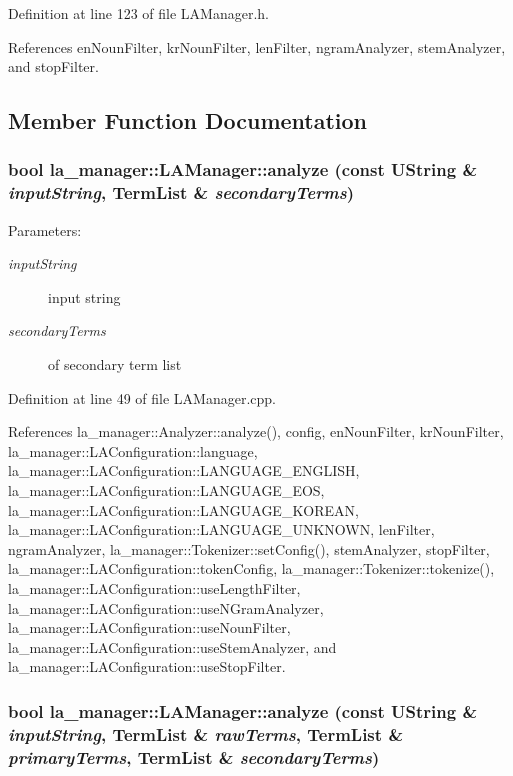Definition at line 123 of file LAManager.h.

References enNounFilter, krNounFilter, lenFilter, ngramAnalyzer, stemAnalyzer, and stopFilter.

\subsection{Member Function Documentation}
\hypertarget{classla__manager_1_1LAManager_1293ab3f57e2b05e1d062031c76444ad}{
\subsubsection[{analyze}]{\setlength{\rightskip}{0pt plus 5cm}bool la\_\-manager::LAManager::analyze (const UString \& {\em inputString}, \/  {\bf TermList} \& {\em secondaryTerms})}}
\label{classla__manager_1_1LAManager_1293ab3f57e2b05e1d062031c76444ad}


\begin{Desc}
\item[Parameters:]
\begin{description}
\item[{\em inputString}]input string \item[{\em secondaryTerms}]of secondary term list \end{description}
\end{Desc}


Definition at line 49 of file LAManager.cpp.

References la\_\-manager::Analyzer::analyze(), config, enNounFilter, krNounFilter, la\_\-manager::LAConfiguration::language, la\_\-manager::LAConfiguration::LANGUAGE\_\-ENGLISH, la\_\-manager::LAConfiguration::LANGUAGE\_\-EOS, la\_\-manager::LAConfiguration::LANGUAGE\_\-KOREAN, la\_\-manager::LAConfiguration::LANGUAGE\_\-UNKNOWN, lenFilter, ngramAnalyzer, la\_\-manager::Tokenizer::setConfig(), stemAnalyzer, stopFilter, la\_\-manager::LAConfiguration::tokenConfig, la\_\-manager::Tokenizer::tokenize(), la\_\-manager::LAConfiguration::useLengthFilter, la\_\-manager::LAConfiguration::useNGramAnalyzer, la\_\-manager::LAConfiguration::useNounFilter, la\_\-manager::LAConfiguration::useStemAnalyzer, and la\_\-manager::LAConfiguration::useStopFilter.\hypertarget{classla__manager_1_1LAManager_3fc44ac17a38ba0e63e677df9798d114}{
\subsubsection[{analyze}]{\setlength{\rightskip}{0pt plus 5cm}bool la\_\-manager::LAManager::analyze (const UString \& {\em inputString}, \/  {\bf TermList} \& {\em rawTerms}, \/  {\bf TermList} \& {\em primaryTerms}, \/  {\bf TermList} \& {\em secondaryTerms})}}
\label{classla__manager_1_1LAManager_3fc44ac17a38ba0e63e677df9798d114}


